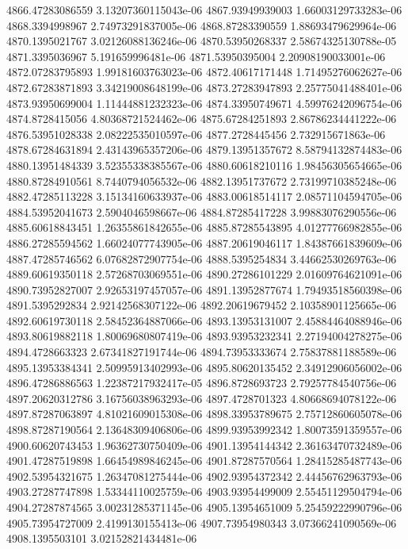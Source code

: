 {4866.47283086559 3.13207360115043e-06
4867.93949939003 1.66003129733283e-06
4868.3394998967 2.74973291837005e-06
4868.87283390559 1.88693479629964e-06
4870.1395021767 3.02126088136246e-06
4870.53950268337 2.58674325130788e-05
4871.3395036967 5.191659996481e-06
4871.53950395004 2.20908190033001e-06
4872.07283795893 1.99181603763023e-06
4872.40617171448 1.71495276062627e-06
4872.67283871893 3.34219008648199e-06
4873.27283947893 2.25775041488401e-06
4873.93950699004 1.11444881232323e-06
4874.33950749671 4.59976242096754e-06
4874.8728415056 4.80368721524462e-06
4875.67284251893 2.86786234441222e-06
4876.53951028338 2.08222535010597e-06
4877.2728445456 2.732915671863e-06
4878.67284631894 2.43143965357206e-06
4879.13951357672 8.58794132874483e-06
4880.13951484339 3.52355338385567e-06
4880.60618210116 1.98456305654665e-06
4880.87284910561 8.7440794056532e-06
4882.13951737672 2.73199710385248e-06
4882.47285113228 3.15134160633937e-06
4883.00618514117 2.08571104594705e-06
4884.53952041673 2.5904046598667e-06
4884.87285417228 3.99883076290556e-06
4885.60618843451 1.26355861842655e-06
4885.87285543895 4.01277766982855e-06
4886.27285594562 1.66024077743905e-06
4887.20619046117 1.84387661839609e-06
4887.47285746562 6.07682872907754e-06
4888.5395254834 3.44662530269763e-06
4889.60619350118 2.57268703069551e-06
4890.27286101229 2.01609764621091e-06
4890.73952827007 2.92653197457057e-06
4891.13952877674 1.79493518560398e-06
4891.5395292834 2.92142568307122e-06
4892.20619679452 2.10358901125665e-06
4892.60619730118 2.58452364887066e-06
4893.13953131007 2.45884464088946e-06
4893.80619882118 1.80069680807419e-06
4893.93953232341 2.27194004278275e-06
4894.4728663323 2.67341827191744e-06
4894.73953333674 2.75837881188589e-06
4895.13953384341 2.50995913402993e-06
4895.80620135452 2.34912906056002e-06
4896.47286886563 1.22387217932417e-05
4896.8728693723 2.79257784540756e-06
4897.20620312786 3.16756038963293e-06
4897.4728701323 4.80668694078122e-06
4897.87287063897 4.81021609015308e-06
4898.33953789675 2.75712860605078e-06
4898.87287190564 2.13648309406806e-06
4899.93953992342 1.80073591359557e-06
4900.60620743453 1.96362730750409e-06
4901.13954144342 2.36163470732489e-06
4901.47287519898 1.66454989846245e-06
4901.87287570564 1.28415285487743e-06
4902.53954321675 1.26347081275444e-06
4902.93954372342 2.44456762963793e-06
4903.27287747898 1.53344110025759e-06
4903.93954499009 2.55451129504794e-06
4904.27287874565 3.00231285371145e-06
4905.13954651009 5.25459222990796e-06
4905.73954727009 2.4199130155413e-06
4907.73954980343 3.07366241090569e-06
4908.1395503101 3.02152821434481e-06
}
